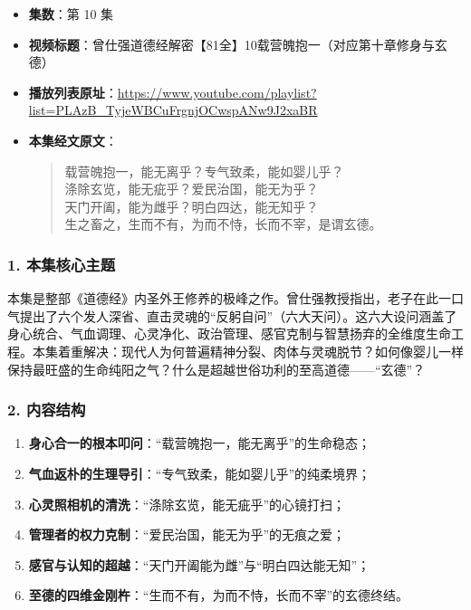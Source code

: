 \begin{itemize}
    \item \textbf{集数}：第 10 集
    \item \textbf{视频标题}：曾仕强道德经解密【81全】10载营魄抱一（对应第十章修身与玄德）
    \item \textbf{播放列表原址}：\url{https://www.youtube.com/playlist?list=PLAzB_TyjeWBCuFrgnjOCwspANw9J2xaBR}
    \item \textbf{本集经文原文}：
    \begin{quote}\kaishu
    载营魄抱一，能无离乎？专气致柔，能如婴儿乎？\\
    涤除玄览，能无疵乎？爱民治国，能无为乎？\\
    天门开阖，能为雌乎？明白四达，能无知乎？\\
    生之畜之，生而不有，为而不恃，长而不宰，是谓玄德。
    \end{quote}
\end{itemize}

\subsubsection{1. 本集核心主题}
本集是整部《道德经》内圣外王修养的极峰之作。曾仕强教授指出，老子在此一口气提出了六个发人深省、直击灵魂的“反躬自问”（六大天问）。这六大设问涵盖了身心统合、气血调理、心灵净化、政治管理、感官克制与智慧扬弃的全维度生命工程。本集着重解决：现代人为何普遍精神分裂、肉体与灵魂脱节？如何像婴儿一样保持最旺盛的生命纯阳之气？什么是超越世俗功利的至高道德——“玄德”？

\subsubsection{2. 内容结构}
\begin{enumerate}
    \item \textbf{身心合一的根本叩问}：“载营魄抱一，能无离乎”的生命稳态；
    \item \textbf{气血返朴的生理导引}：“专气致柔，能如婴儿乎”的纯柔境界；
    \item \textbf{心灵照相机的清洗}：“涤除玄览，能无疵乎”的心镜打扫；
    \item \textbf{管理者的权力克制}：“爱民治国，能无为乎”的无痕之爱；
    \item \textbf{感官与认知的超越}：“天门开阖能为雌”与“明白四达能无知”；
    \item \textbf{至德的四维金刚杵}：“生而不有，为而不恃，长而不宰”的玄德终结。
\end{enumerate}


